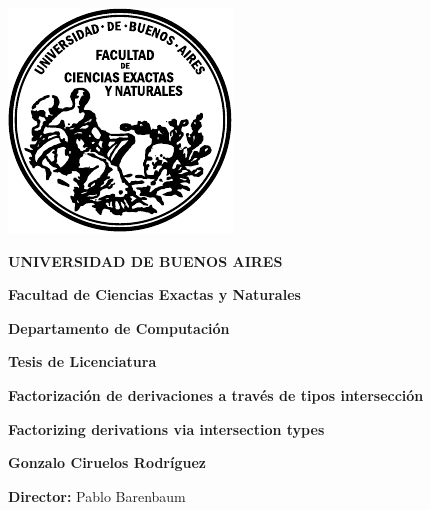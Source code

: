 
\thispagestyle{empty}

\begin {center}

\includegraphics[scale=.4,natwidth=100,natheight=100]{template_tesis/logofcen.pdf}

\medskip
\textbf{UNIVERSIDAD DE BUENOS AIRES}

\smallskip

\textbf{Facultad de Ciencias Exactas y Naturales}

\smallskip

\textbf{Departamento de Computaci\'on}

\vspace{3.5cm}

\textbf{\large Tesis de Licenciatura}


\vspace{1.5cm}

\textbf{\Large Factorizaci\'on de derivaciones a trav\'es de tipos intersecci\'on}

\textbf{\large Factorizing derivations via intersection types}

\vspace{1.5cm}


\textbf{\large Gonzalo Ciruelos Rodríguez}

\end {center}


\vspace{1.5cm}

\noindent \textbf{Director:} Pablo Barenbaum


\vspace{3cm}

